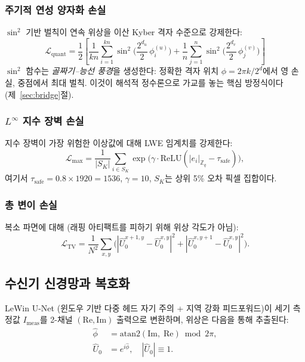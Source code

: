 \documentclass[11pt, a4paper]{article}
\theoremstyle{definition}
\theoremstyle{plain}
\newcommand{\Zq}{\mathbb{Z}_q}
\begin{document}
\subsubsection{주기적 연성 양자화 손실}
$\sin^2$ 기반 벌칙이 연속 위상을 이산 Kyber 격자 수준으로 강제한다:
\begin{equation}
\boxed{
  \mathcal{L}_{\mathrm{quant}} = \frac{1}{2}\!\left[
    \frac{1}{kn}\sum_{i=1}^{kn}
    \sin^2\!\Big(\frac{2^{d_u}}{2}\,\phi_i^{(u)}\Big) +
    \frac{1}{n}\sum_{j=1}^{n}
    \sin^2\!\Big(\frac{2^{d_v}}{2}\,\phi_j^{(v)}\Big)
  \right]
}
\label{eq:loss_quant}
\end{equation}
$\sin^2$ 함수는 \textit{골짜기--능선 풍경}을 생성한다: 정확한 격자 위치 $\phi = 2\pi k / 2^d$에서 영 손실, 중점에서 최대 벌칙. 이것이 해석적 정수론으로 가교를 놓는 핵심 방정식이다 (제~\ref{sec:bridge}절).

\subsubsection{$L^\infty$ 지수 장벽 손실}
지수 장벽이 가장 위험한 이상값에 대해 LWE 임계치를 강제한다:
\begin{equation}
  \mathcal{L}_{\max} = \frac{1}{|S_K|}\sum_{i \in S_K}
  \exp\!\big(\gamma \cdot \mathrm{ReLU}(|e_i|_{\Zq} -
  \tau_{\mathrm{safe}})\big),
  \label{eq:loss_max}
\end{equation}
여기서 $\tau_{\mathrm{safe}} = 0.8 \times 1920 = 1536$, $\gamma = 10$, $S_K$는 상위 5\% 오차 픽셀 집합이다.

\subsubsection{총 변이 손실}
복소 파면에 대해 (래핑 아티팩트를 피하기 위해 위상 각도가 아님):
\begin{equation}
  \mathcal{L}_{\mathrm{TV}} = \frac{1}{N^2}\sum_{x,y}
  \big(|\hat{U}_0^{x+1,y} - \hat{U}_0^{x,y}|^2 +
  |\hat{U}_0^{x,y+1} - \hat{U}_0^{x,y}|^2\big).
  \label{eq:loss_tv}
\end{equation}


\subsection{수신기 신경망과 복호화}
\label{sec:rx}

LeWin U-Net (윈도우 기반 다중 헤드 자기 주의 + 지역 강화 피드포워드)이 세기 측정값 $I_{\mathrm{meas}}$를 2-채널 $(\mathrm{Re}, \mathrm{Im})$ 출력으로 변환하며, 위상은 다음을 통해 추출된다:
\begin{align}
  \hat{\phi} &= \mathrm{atan2}(\mathrm{Im},\; \mathrm{Re}) \bmod 2\pi,
  \label{eq:phase_extract}\\
  \hat{U}_0 &= e^{i\hat{\phi}}, \quad |\hat{U}_0| \equiv 1.
  \label{eq:wavefront}
\end{align}
\end{document}

